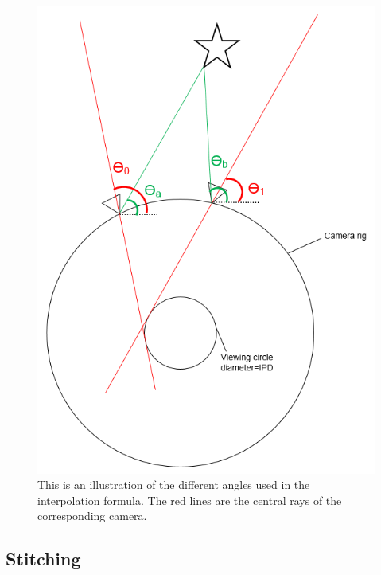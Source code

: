 \documentclass[10pt,twocolumn,letterpaper]{article}
\begin{document}
\begin{figure}[t]
\begin{center}
   \includegraphics[width=0.7\linewidth]{pictures/interpolation.PNG}
\end{center}
   \caption{This is an illustration of the different angles used in the interpolation formula. The red lines are the central rays of the corresponding camera.}
\label{interpolation}
\end{figure}

\subsection{Stitching}



\end{document}
